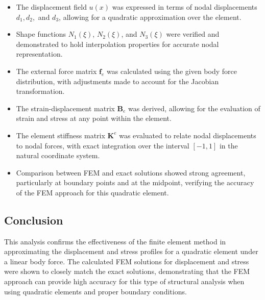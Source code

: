 \begin{itemize}
    \item The displacement field \( u(x) \) was expressed in terms of nodal displacements \( d_1, d_2, \) and \( d_3 \), allowing for a quadratic approximation over the element.
    \item Shape functions \( N_1(\xi) \), \( N_2(\xi) \), and \( N_3(\xi) \) were verified and demonstrated to hold interpolation properties for accurate nodal representation.
    \item The external force matrix \( \mathbf{f}_e \) was calculated using the given body force distribution, with adjustments made to account for the Jacobian transformation.
    \item The strain-displacement matrix \( \mathbf{B}_e \) was derived, allowing for the evaluation of strain and stress at any point within the element.
    \item The element stiffness matrix \( \mathbf{K}^e \) was evaluated to relate nodal displacements to nodal forces, with exact integration over the interval \([-1, 1]\) in the natural coordinate system.
    \item Comparison between FEM and exact solutions showed strong agreement, particularly at boundary points and at the midpoint, verifying the accuracy of the FEM approach for this quadratic element.
\end{itemize}

\subsection*{Conclusion}

This analysis confirms the effectiveness of the finite element method in approximating the displacement and stress profiles for a quadratic element under a linear body force. The calculated FEM solutions for displacement and stress were shown to closely match the exact solutions, demonstrating that the FEM approach can provide high accuracy for this type of structural analysis when using quadratic elements and proper boundary conditions. 





